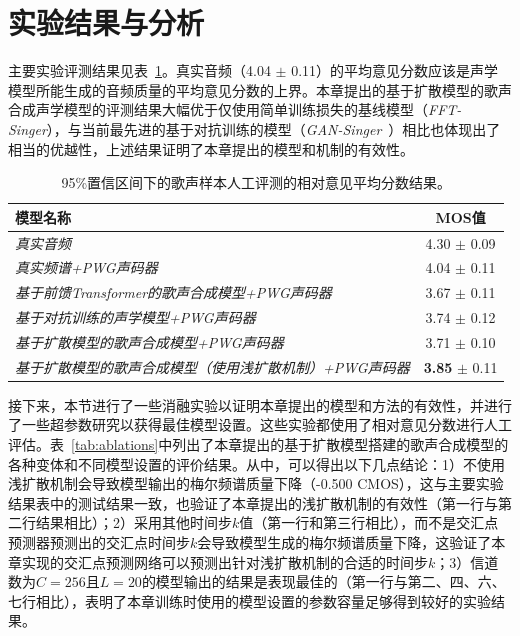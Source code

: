 \section{实验结果与分析}
主要实验评测结果见表~\ref{tab:main_exp}。真实音频（4.04 $\pm$ 0.11）的平均意见分数应该是声学模型所能生成的音频质量的平均意见分数的上界。本章提出的基于扩散模型的歌声合成声学模型的评测结果大幅优于仅使用简单训练损失的基线模型（\textit{FFT-Singer}），与当前最先进的基于对抗训练的模型（\textit{GAN-Singer}~\citep{wu2020adversarially}）相比也体现出了相当的优越性，上述结果证明了本章提出的模型和机制的有效性。
\begin{table}[!h]
	\centering
	\setlength{\belowcaptionskip}{8pt} %
	\caption{95\%置信区间下的歌声样本人工评测的相对意见平均分数结果。}
	\begin{tabular}{|l|c|}
		\hline
		\textbf{模型名称} &  \textbf{MOS值}  \\
		\hline
		\textit{真实音频} & 4.30 $\pm$ 0.09  \\
	    \textit{真实频谱+PWG声码器} & 4.04 $\pm$ 0.11  \\
		\hline
		\textit{基于前馈Transformer的歌声合成模型+PWG声码器} & 3.67 $\pm$ 0.11 \\
		\textit{基于对抗训练的声学模型+PWG声码器} & 3.74 $\pm$ 0.12  \\
		\hline
		\textit{基于扩散模型的歌声合成模型+PWG声码器} & 3.71 $\pm$ 0.10 \\
		\textit{基于扩散模型的歌声合成模型（使用浅扩散机制）+PWG声码器} & \textbf{3.85} $\pm$ 0.11 \\
		\hline
	\end{tabular}
	\label{tab:main_exp}
\end{table}
接下来，本节进行了一些消融实验以证明本章提出的模型和方法的有效性，并进行了一些超参数研究以获得最佳模型设置。这些实验都使用了相对意见分数进行人工评估。表~\ref{tab:ablations}中列出了本章提出的基于扩散模型搭建的歌声合成模型的各种变体和不同模型设置的评价结果。从中，可以得出以下几点结论：1）不使用浅扩散机制会导致模型输出的梅尔频谱质量下降（-0.500 CMOS），这与主要实验结果表中的测试结果一致，也验证了本章提出的浅扩散机制的有效性（第一行与第二行结果相比）；2）采用其他时间步$k$值（第一行和第三行相比），而不是交汇点预测器预测出的交汇点时间步$k$会导致模型生成的梅尔频谱质量下降，这验证了本章实现的交汇点预测网络可以预测出针对浅扩散机制的合适的时间步$k$；3）信道数为$C=256$且$L=20$的模型输出的结果是表现最佳的（第一行与第二、四、六、七行相比），表明了本章训练时使用的模型设置的参数容量足够得到较好的实验结果。
